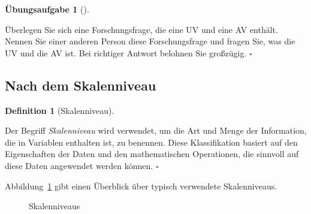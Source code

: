 \documentclass[
  a4paper,
]{scrbook}
\theoremstyle{definition}
\theoremstyle{definition}
\newtheorem{definition}{Definition}[chapter]
\theoremstyle{definition}
\newtheorem{exercise}{Übungsaufgabe}[chapter]
\theoremstyle{remark}
\begin{document}
\begin{exercise}[]\protect\hypertarget{exr-uvav}{}\label{exr-uvav}

Überlegen Sie sich eine Forschungsfrage, die eine UV und eine AV
enthält. Nennen Sie einer anderen Person diese Forschungsfrage und
fragen Sie, was die UV und die AV ist. Bei richtiger Antwort belohnen
Sie großzügig. \(\square\)

\end{exercise}

\subsection{Nach dem Skalenniveau}\label{nach-dem-skalenniveau}

\begin{definition}[Skalenniveau]\protect\hypertarget{def-skalenniveau}{}\label{def-skalenniveau}

Der Begriff \emph{Skalenniveau} wird verwendet, um die Art und Menge der
Information, die in Variablen enthalten ist, zu benennen. Diese
Klassifikation basiert auf den Eigenschaften der Daten und den
mathematischen Operationen, die sinnvoll auf diese Daten angewendet
werden können. \(\square\)

\end{definition}

Abbildung~\ref{fig-skalenniveau} gibt einen Überblick über typisch
verwendete Skalenniveaus.

\begin{figure}


\caption{\label{fig-skalenniveau}Skalenniveaus}

\end{figure}%
\end{document}
